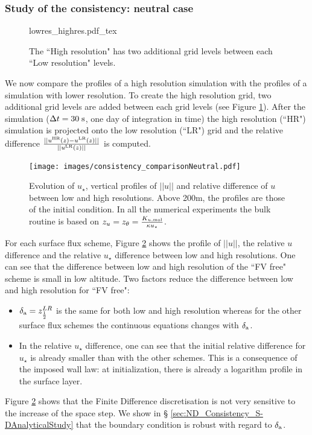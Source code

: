 \subsubsection{Study of the consistency: neutral case}
\begin{figure}
	\centering
	{lowres_highres.pdf_tex}
	\caption{The ``High resolution" has two additional grid levels
	between each ``Low resolution" levels.}
	\label{fig:ND_Consistency_lowres_highres}
\end{figure}
We now compare the profiles of a high
resolution simulation with the profiles
of a simulation with lower resolution. To create the high resolution grid,
two additional grid levels are added between each grid levels
(see Figure \ref{fig:ND_Consistency_lowres_highres}).
After the simulation ($\Delta t=30\;{\rm s}$,
one day of integration in time) the high resolution (``HR") simulation
is projected onto the low resolution (``LR") grid and the relative difference
$\frac{||u^{\rm HR}(z) - u^{\rm LR}(z)||}{||u^{\rm LR}(z)||}$ is
computed.
\begin{figure}
	\centering
	\texttt{[image: images/consistency\_comparisonNeutral.pdf]}
	\caption{ Evolution of $u_\star$, vertical profiles of $||u||$
	and relative difference of $u$ between low and high resolutions.
	Above 200m, the profiles are those of the initial condition.
	In all the numerical experiments the bulk routine is based on
	$z_u = z_\theta = \frac{K_{u, \rm mol}}{\kappa u_\star}$.
	}
	\label{fig:ND_Consistency_Neutral}
\end{figure}
For each surface flux scheme, Figure \ref{fig:ND_Consistency_Neutral}
shows the profile of $||u||$,
the relative $u$ difference and the relative $u_\star$ difference
between low and high resolutions.
One can see that the difference between low and high resolution of
the ``FV free" scheme is small in low altitude.
Two factors reduce the difference between low and high resolution
for ``FV free":
\begin{itemize}
	\item $\delta_{\rm a} = z_{\frac{1}{2}}^{LR}$ is the same
		for both low and high resolution whereas for
		the other surface flux schemes the continuous
		equations changes with $\delta_{\rm a}$.
	\item In the relative $u_\star$ difference, one can see
		that the initial relative difference for
		$u_\star$ is already smaller than with the
		other schemes. This is a consequence of the
		imposed wall law: at initialization, there
		is already a logarithm profile in the
		surface layer.
\end{itemize}
Figure \ref{fig:ND_Consistency_Neutral} shows that the
Finite Difference discretisation is not very sensitive
to the increase of the space step. We show in \S
\ref{sec:ND_Consistency_S-DAnalyticalStudy} that
the boundary condition is robust with regard to
$\delta_{\rm a}$.

